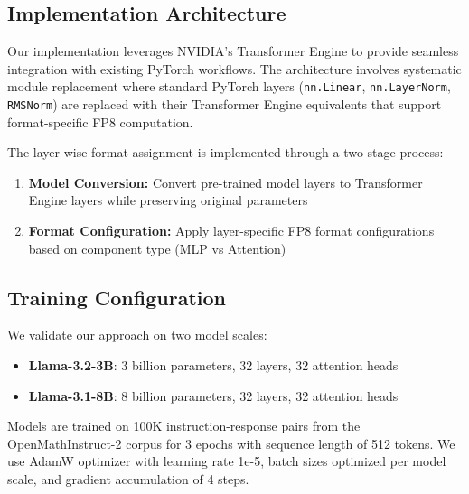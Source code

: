 \subsection{Implementation Architecture}

Our implementation leverages NVIDIA's Transformer Engine to provide seamless integration with existing PyTorch workflows. The architecture involves systematic module replacement where standard PyTorch layers (\texttt{nn.Linear}, \texttt{nn.LayerNorm}, \texttt{RMSNorm}) are replaced with their Transformer Engine equivalents that support format-specific FP8 computation.

The layer-wise format assignment is implemented through a two-stage process:
\begin{enumerate}
\item \textbf{Model Conversion:} Convert pre-trained model layers to Transformer Engine layers while preserving original parameters
\item \textbf{Format Configuration:} Apply layer-specific FP8 format configurations based on component type (MLP vs Attention)
\end{enumerate}

\subsection{Training Configuration}

We validate our approach on two model scales:
\begin{itemize}
\item \textbf{Llama-3.2-3B}: 3 billion parameters, 32 layers, 32 attention heads
\item \textbf{Llama-3.1-8B}: 8 billion parameters, 32 layers, 32 attention heads
\end{itemize}

Models are trained on 100K instruction-response pairs from the OpenMathInstruct-2 corpus for 3 epochs with sequence length of 512 tokens. We use AdamW optimizer with learning rate 1e-5, batch sizes optimized per model scale, and gradient accumulation of 4 steps.
